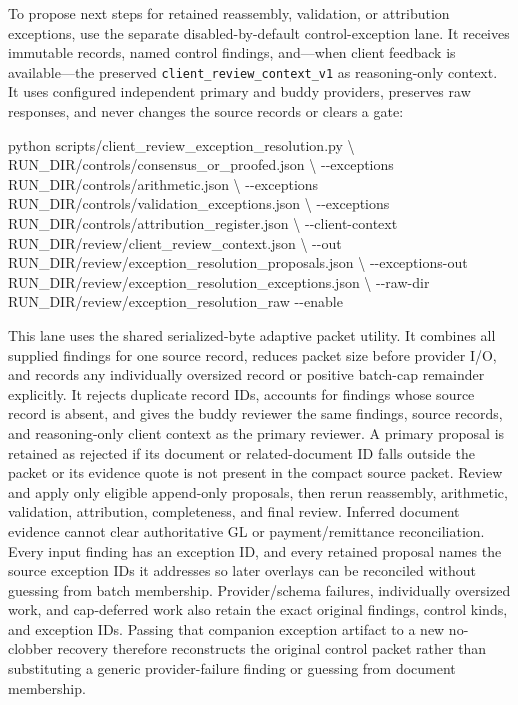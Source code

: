 \documentclass[
]{article}
\newenvironment{Shaded}{}{}
\newcommand{\AttributeTok}[1]{\textcolor[rgb]{0.49,0.56,0.16}{#1}}
\newcommand{\DataTypeTok}[1]{\textcolor[rgb]{0.56,0.13,0.00}{#1}}
\newcommand{\ExtensionTok}[1]{#1}
\newcommand{\NormalTok}[1]{#1}
\begin{document}
To propose next steps for retained reassembly, validation, or
attribution exceptions, use the separate disabled-by-default
control-exception lane. It receives immutable records, named control
findings, and---when client feedback is available---the preserved
\texttt{client\_\allowbreak{}review\_\allowbreak{}context\_\allowbreak{}v1}
as reasoning-only context. It uses configured independent primary and
buddy providers, preserves raw responses, and never changes the source
records or clears a gate:

\begin{Shaded}
\begin{Highlighting}[]
\ExtensionTok{python}\NormalTok{ scripts/client\_review\_exception\_resolution.py }\DataTypeTok{\textbackslash{}}
\NormalTok{  RUN\_DIR/controls/consensus\_or\_proofed.json }\DataTypeTok{\textbackslash{}}
  \AttributeTok{{-}{-}exceptions}\NormalTok{ RUN\_DIR/controls/arithmetic.json }\DataTypeTok{\textbackslash{}}
  \AttributeTok{{-}{-}exceptions}\NormalTok{ RUN\_DIR/controls/validation\_exceptions.json }\DataTypeTok{\textbackslash{}}
  \AttributeTok{{-}{-}exceptions}\NormalTok{ RUN\_DIR/controls/attribution\_register.json }\DataTypeTok{\textbackslash{}}
  \AttributeTok{{-}{-}client{-}context}\NormalTok{ RUN\_DIR/review/client\_review\_context.json }\DataTypeTok{\textbackslash{}}
  \AttributeTok{{-}{-}out}\NormalTok{ RUN\_DIR/review/exception\_resolution\_proposals.json }\DataTypeTok{\textbackslash{}}
  \AttributeTok{{-}{-}exceptions{-}out}\NormalTok{ RUN\_DIR/review/exception\_resolution\_exceptions.json }\DataTypeTok{\textbackslash{}}
  \AttributeTok{{-}{-}raw{-}dir}\NormalTok{ RUN\_DIR/review/exception\_resolution\_raw }\AttributeTok{{-}{-}enable}
\end{Highlighting}
\end{Shaded}

This lane uses the shared serialized-byte adaptive packet utility. It
combines all supplied findings for one source record, reduces packet
size before provider I/O, and records any individually oversized record
or positive batch-cap remainder explicitly. It rejects duplicate record
IDs, accounts for findings whose source record is absent, and gives the
buddy reviewer the same findings, source records, and reasoning-only
client context as the primary reviewer. A primary proposal is retained
as rejected if its document or related-document ID falls outside the
packet or its evidence quote is not present in the compact source
packet. Review and apply only eligible append-only proposals, then rerun
reassembly, arithmetic, validation, attribution, completeness, and final
review. Inferred document evidence cannot clear authoritative GL or
payment/remittance reconciliation. Every input finding has an exception
ID, and every retained proposal names the source exception IDs it
addresses so later overlays can be reconciled without guessing from
batch membership. Provider/schema failures, individually oversized work,
and cap-deferred work also retain the exact original findings, control
kinds, and exception IDs. Passing that companion exception artifact to a
new no-clobber recovery therefore reconstructs the original control
packet rather than substituting a generic provider-failure finding or
guessing from document membership.
\end{document}
